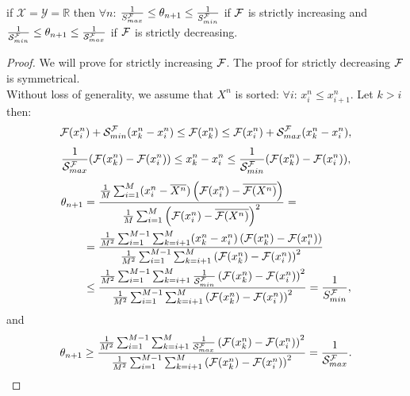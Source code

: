 \documentclass[nohyperref]{article}
\begin{document}
\begin{lemma}\label{lm:theta_bounds_1d}
if $\mathcal{X}=\mathcal{Y}=\mathbb{R}$ then $\forall n$: $\frac{1}{S_{max}^{\mathcal{F}}}\leq \theta_{n+1}  \leq \frac{1}{S_{min}^{\mathcal{F}}}$ if $\mathcal{F}$ is strictly increasing and $\frac{1}{\mathcal{S}_{min}^{\mathcal{F}}}\leq \theta_{n+1}  \leq \frac{1}{\mathcal{S}_{max}^{\mathcal{F}}}$ if $\mathcal{F}$ is strictly decreasing. 
\end{lemma}
\begin{proof}
We will prove for strictly increasing $\mathcal{F}$. The proof for strictly decreasing $\mathcal{F}$ is symmetrical.\\ 
Without loss of generality, we assume that $X^n$ is sorted: $\forall i$: $x_i^n\leq x_{i+1}^n$. Let $k>i$ then:
\begin{align*}
    \mathcal{F}(x_i^n) + \mathcal{S}_{min}^{\mathcal{F}} (x_k^n-x_i^n) \leq \mathcal{F}(x_k^n)\leq   \mathcal{F}(x_i^n) + \mathcal{S}_{max}^{\mathcal{F}} (x_k^n-x_i^n),
\end{align*}
\begin{align*}
    \frac{1}{\mathcal{S}_{max}^{\mathcal{F}}}(\mathcal{F}(x_k^n)-\mathcal{F}(x_i^n))\leq x_k^n - x_i^n\leq \frac{1}{\mathcal{S}_{min}^{\mathcal{F}}}(\mathcal{F}(x_k^n)-\mathcal{F}(x_i^n)),
\end{align*}
\begin{align*}
    \theta_{n+1} &=\frac{\frac{1}{M}\sum_{i=1}^M (x_i^n-\overline{X^n})\left(\mathcal{F}(x_i^n)-\overline{\mathcal{F}(X^n)}\right)}{\frac{1}{M}\sum_{i=1}^M \left(\mathcal{F}(x_i^n)-\overline{\mathcal{F}(X^n)}\right)^2}=\\
    &=\frac{\frac{1}{M^2}\sum_{i=1}^{M-1}\sum_{k=i+1}^M (x_k^n-x_i^n)\left(\mathcal{F}(x_k^n)-\mathcal{F}(x_i^n)\right)}{\frac{1}{M^2}\sum_{i=1}^{M-1}\sum_{k=i+1}^M \left(\mathcal{F}(x_k^n)-\mathcal{F}(x_i^n)\right)^2}\\
    &\leq \frac{\frac{1}{M^2}\sum_{i=1}^{M-1}\sum_{k=i+1}^M \frac{1}{\mathcal{S}_{min}^{\mathcal{F}}} \left(\mathcal{F}(x_k^n)-\mathcal{F}(x_i^n)\right)^2}{\frac{1}{M^2}\sum_{i=1}^{M-1}\sum_{k=i+1}^M \left(\mathcal{F}(x_k^n)-\mathcal{F}(x_i^n)\right)^2}=\frac{1}{S_{min}^{\mathcal{F}}},
\end{align*}
and
\begin{align*}
    \theta_{n+1} \geq \frac{\frac{1}{M^2}\sum_{i=1}^{M-1}\sum_{k=i+1}^M \frac{1}{\mathcal{S}_{max}^{\mathcal{F}}} \left(\mathcal{F}(x_k^n)-\mathcal{F}(x_i^n)\right)^2}{\frac{1}{M^2}\sum_{i=1}^{M-1}\sum_{k=i+1}^M \left(\mathcal{F}(x_k^n)-\mathcal{F}(x_i^n)\right)^2}=\frac{1}{\mathcal{S}_{max}^{\mathcal{F}}}.
\end{align*}
\end{proof}
\end{document}

